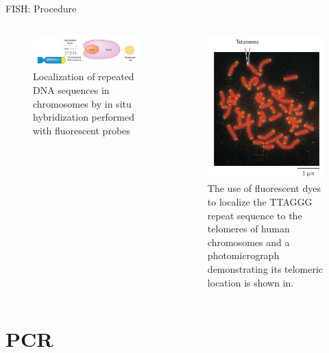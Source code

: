 \documentclass[
  ignorenonframetext,
  aspectratio=169]{beamer}
\begin{document}
\begin{frame}{FISH: Procedure}
\protect\hypertarget{fish-procedure}{}
\begin{columns}[T,onlytextwidth]

\begin{figure}
\includegraphics[width=0.8\linewidth]{./../images/fish_hybridization1} \caption{Localization of repeated DNA sequences in chromosomes by in situ hybridization performed with fluorescent probes}\label{fig:fish-hybridization1}
\end{figure}


\begin{figure}
\includegraphics[width=0.5\linewidth]{./../images/fish_hybridization2} \caption{The use of fluorescent dyes to localize the TTAGGG repeat sequence to the telomeres of human chromosomes and a photomicrograph demonstrating its telomeric location is shown in.}\label{fig:fish-hybridization2}
\end{figure}

\end{columns}
\end{frame}

\hypertarget{pcr}{%
\section{PCR}\label{pcr}}
\end{document}
